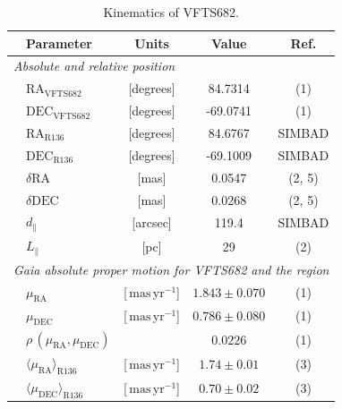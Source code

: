 \documentclass[a4paper,fleqn,usenatbib]{mnras}
\newcommand{\masyr}{\,\mathrm{mas}\,\mathrm{yr}^{-1}}
\begin{document}
\begin{table}
  \begin{center}
    \caption{Kinematics of VFTS682. }
    \begin{tabular}{llc|c|c}
      \hline
      \hline
      &Parameter & Units & Value & Ref.\\
      \hline
      \multicolumn{5}{l}{\emph{Absolute and relative position}} \\
      \hline
         &$\mathrm{RA}_\mathrm{VFTS682}$&[degrees] & \phantom{-0}84.7314 %
                     & (1) \\        
               &$\mathrm{DEC}_\mathrm{VFTS682}$&[degrees] & \phantom{0}-69.0741%
                     & (1)  \\    
                                                     
                        &$\mathrm{RA}_\mathrm{R136}$&[degrees] & \phantom{-0}84.6767
                     &  SIMBAD  \\        
               &$     \mathrm{DEC}_\mathrm{R136}$&[degrees] &  \phantom{0}-69.1009
                     &  SIMBAD \\       
        &$      \delta\mathrm{RA}$  &[mas] & \phantom{-00}0.0547                      
        &  (2, 5)
  \\        
               &$     \delta\mathrm{DEC}$  &[mas] & \phantom{-00}0.0268 
                     &  (2, 5) \\  
                       &$  d_\parallel$  & [arcsec]
                         & 119.4
                                 &  SIMBAD \\
      &$L_\parallel$ & [pc] & 29 & (2) \\
      
                          
                     \hline
           \multicolumn{5}{l}{\emph{Gaia absolute proper motion for VFTS682
      and the region}} \\
      \hline
          &$\mu_\mathrm{RA}$&[$\masyr$] & $1.843\pm 0.070$
                     & (1) \\        
               &$\mu_\mathrm{DEC}$&[$\masyr$] & $0.786\pm 0.080$
                     &  (1) \\        
                 & $\rho\,(\mu_\mathrm{RA}, \mu_\mathrm{DEC})$ &  & $0.0226$
                        & (1)  \\         
       &$\langle\mu_\mathrm{RA}\rangle_\mathrm{R136}$&[$\masyr$] & $1.74\pm0.01$
                        & (3) \\
      &$\langle\mu_\mathrm{DEC}\rangle_\mathrm{R136}$&[$\masyr$]
                & $0.70\pm0.02$ &  (3)\\
\hline
      

\end{tabular}
\end{center}
\end{table}
\end{document}
